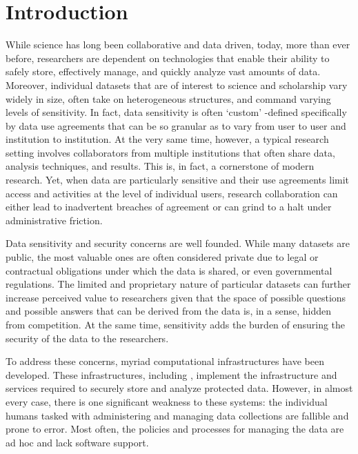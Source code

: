 \section{Introduction}



While science has long been collaborative and data driven, today, more than ever before,
researchers are dependent on technologies that enable their ability to safely store,
effectively manage, and quickly analyze vast amounts of
data. Moreover, individual datasets that are of interest to science and scholarship
vary widely in size, often take on heterogeneous structures, and command varying
levels of sensitivity. In fact, data sensitivity is often `custom' -defined specifically by
data use agreements that can be so granular as to vary from user to user and institution
to institution. At the very same time, however, a typical research setting involves
collaborators from multiple institutions that often share data, analysis techniques,
and results. This is, in fact, a cornerstone of modern research. Yet, when data are
particularly sensitive and their use agreements limit access and activities at the
level of individual users, research collaboration can either lead to inadvertent
breaches of agreement or can grind to a halt under administrative friction.


Data sensitivity and security concerns are well founded. While many datasets are public, the most
valuable ones are often considered private due to legal or contractual obligations under which the data
is shared, or even governmental regulations. The limited and proprietary nature
of particular datasets can further increase perceived value to researchers given that the space of possible
questions and possible answers that can be derived from the data is, in a sense, hidden from competition.
At the same time, sensitivity adds the burden of ensuring the security of the data to the researchers.


To address these concerns, myriad computational infrastructures
have been developed. These infrastructures, including \NAMENS \cite{babuji2016cloud},
implement the infrastructure and services required to securely store and analyze protected
data. However, in almost every case, there is one significant weakness to these systems: the individual humans tasked with administering and managing
data collections are fallible and prone to error. Most often, the policies and processes for managing
the data are ad hoc and lack software support.

